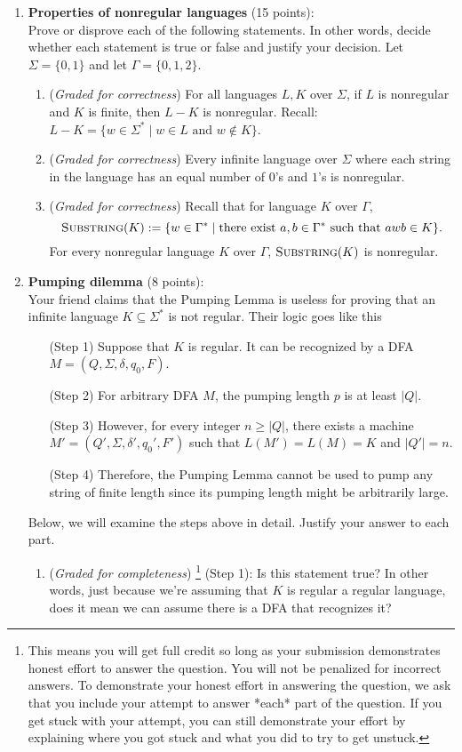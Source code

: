 \documentclass[12pt, oneside]{article}
\newcommand{\gradeCorrect}{({\it Graded for correctness}) }
\newcommand{\gradeComplete}{({\it Graded for completeness}) }
\newcommand{\gradeCompleteFirst}{\gradeComplete\footnote{This means you will 
get full credit so long as your submission demonstrates honest effort to 
answer the question. You will not be penalized for incorrect answers. 
To demonstrate your honest effort in answering the question, we ask 
that you include your attempt to answer *each* part of the question. 
If you get stuck with your attempt, you can still demonstrate 
your effort by explaining where you got stuck and what 
you did to try to get unstuck.} }
\newcommand{\SUBSTRING}{\textsc{Substring}}
\begin{document}
\begin{enumerate}
\item \textbf{Properties of nonregular languages} (15 points): \\
Prove or disprove each of the following statements. In other words, decide whether 
each statement is true or false and justify your decision. 
Let $\Sigma = \{0,1\}$ and let $\Gamma = \{0,1,2\}$.
\begin{enumerate}
    \item\gradeCorrect For all languages $L, K$ over
    $\Sigma$, if $L$ is nonregular and $K$ is finite, then $L - K$ is nonregular.
    Recall: $L - K = \{ w \in \Sigma^* \mid w \in L \text{ and } w \notin K\}$.
    \item\gradeCorrect Every infinite language over $\Sigma$ 
    where each string in the language has an equal number of $0$'s and 
    $1$'s is nonregular.
    \item\gradeCorrect Recall that for language $K$ over $\Gamma$,
    \[
    \SUBSTRING(K) := \{ w \in \Gamma^* \mid \text{there exist } a,b \in \Gamma^* \text{ such that } awb \in K\}.
    \]
    For every nonregular language $K$ over $\Gamma$, $\SUBSTRING(K)$ is nonregular.
\end{enumerate}

\item \textbf{Pumping dilemma} (8 points): \\
Your friend claims that the Pumping Lemma is useless for proving that an infinite language 
$K \subseteq \Sigma^*$ is not regular. Their logic goes like this

\begin{enumerate}[label=(Step~\arabic*), leftmargin=2cm]
\item[(Step 1)] Suppose that $K$ is regular. It can be recognized by a 
DFA $M = (Q, \Sigma, \delta, q_0, F)$.
\item[(Step 2)] For arbitrary DFA $M$, the pumping length $p$ is at least $|Q|$.
\item[(Step 3)] However, for every integer $n \ge |Q|$, there exists a machine 
$M' = (Q', \Sigma, \delta', q_0', F')$ such that $L(M') = L(M) = K$ and $|Q'| = n$.
\item[(Step 4)] Therefore, the Pumping Lemma cannot be used to pump any string 
of finite length since its pumping length might be arbitrarily large.
\end{enumerate}

Below, we will examine the steps above in detail. Justify your answer to each part.
\begin{enumerate}
    \item\gradeCompleteFirst (Step 1): Is this statement true? In other words, just because we're assuming that $K$ is regular a regular language, does it mean we can assume there is a DFA that recognizes it?


\end{enumerate}
\end{enumerate}
\end{document}
